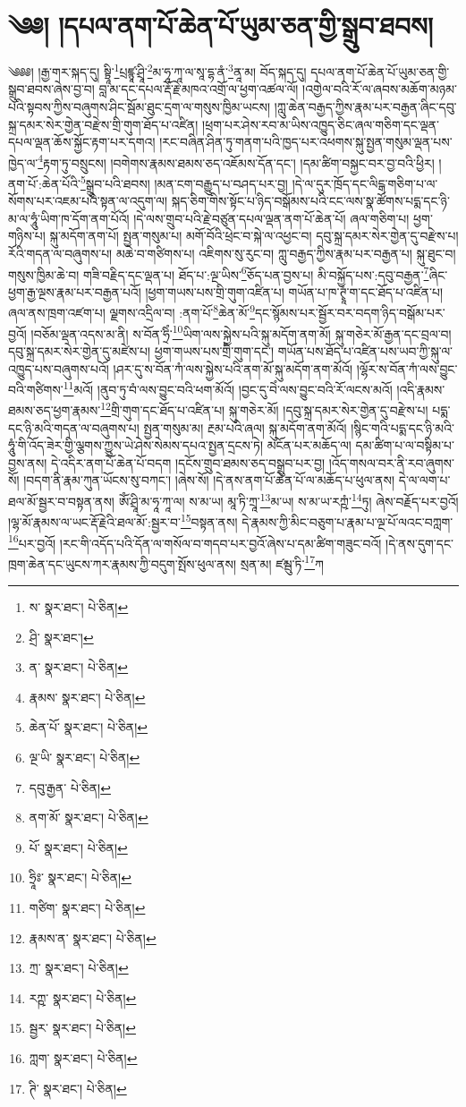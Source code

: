 \setcounter{footnote}{0} 
\chapter{༄༅། །དཔལ་ནག་པོ་ཆེན་པོ་ཡུམ་ཅན་གྱི་སྒྲུབ་ཐབས།}༄༅༅། །རྒྱ་གར་སྐད་དུ། སྟྲཱི་\footnote{ས་  སྣར་ཐང་།  པེ་ཅིན། }པྲཛྙཱ་ཤྲཱི་\footnote{ཤྲི་  སྣར་ཐང་། }མ་ཧཱ་ཀཱ་ལ་སཱ་དྷ་ནཾ་\footnote{ན་  སྣར་ཐང་།  པེ་ཅིན། }ནཱ་མ། བོད་སྐད་དུ། དཔལ་ནག་པོ་ཆེན་པོ་ཡུམ་ཅན་གྱི་སྒྲུབ་ཐབས་ཞེས་བྱ་བ། བླ་མ་དང་དཔལ་རྡོ་རྗེ་མཁའ་འགྲོ་ལ་ཕྱག་འཚལ་ལོ། །འགྱེལ་བའི་རོ་ལ་ཞབས་མཆོག་མཉམ་པའི་སྟབས་ཀྱིས་བཞུགས་ཤིང་སྦོམ་ཐུང་དྲག་ལ་གསུས་ཁྱིམ་ཡངས། །ཀླུ་ཆེན་བརྒྱད་ཀྱིས་རྣམ་པར་བརྒྱན་ཞིང་དབུ་སྐྲ་དམར་སེར་གྱེན་བརྫེས་གྲི་གུག་ཐོད་པ་འཛིན། །ཕྲག་པར་ཤེས་རབ་མ་ཡིས་འཁྱུད་ཅིང་ཞལ་གཅིག་དང་ལྡན་དཔལ་ལྡན་ཆོས་སྐྱོང་རྟག་པར་དགའ། །རང་བཞིན་ཤིན་ཏུ་གནག་པའི་ཁྱད་པར་འཕགས་སྐུ་སྤྱན་གསུམ་ལྡན་པས་ཁྱེད་ལ་\footnote{རྣམས་  སྣར་ཐང་།  པེ་ཅིན། }རྟག་ཏུ་བསྲུངས། །བགེགས་རྣམས་ཐམས་ཅད་འཇོམས་དོན་དང་། །དམ་ཚིག་བསྐྱང་བར་བྱ་བའི་ཕྱིར། །ནག་པོ་:ཆེན་པོའི་\footnote{ཆེན་པོ་  སྣར་ཐང་།  པེ་ཅིན། }སྒྲུབ་པའི་ཐབས། །མན་ངག་བརྒྱུད་པ་བཤད་པར་བྱ། །དེ་ལ་དུར་ཁྲོད་དང་ལིངྒ་གཅིག་པ་ལ་སོགས་པར་འཇམ་པའི་སྟན་ལ་འདུག་ལ། སྐད་ཅིག་གིས་སྟོང་པ་ཉིད་བསྒོམས་པའི་ངང་ལས་སྣ་ཚོགས་པདྨ་དང་ཉི་མ་ལ་ཧཱུཾ་ཡིག་ཁ་དོག་ནག་པོའོ། །དེ་ལས་གྲུབ་པའི་རྗེ་བཙུན་དཔལ་ལྡན་ནག་པོ་ཆེན་པོ། ཞལ་གཅིག་པ། ཕྱག་གཉིས་པ། སྐུ་མདོག་ནག་པོ། སྤྱན་གསུམ་པ། མགོ་བོའི་ཕྲེང་བ་སྐེ་ལ་འཕྱང་བ། དབུ་སྐྲ་དམར་སེར་གྱེན་དུ་བརྫེས་པ། རོའི་གདན་ལ་བཞུགས་པ། མཆེ་བ་གཙིགས་པ། འཇིགས་སུ་རུང་བ། ཀླུ་བརྒྱད་ཀྱིས་རྣམ་པར་བརྒྱན་པ། སྐུ་ཐུང་བ། གསུས་ཁྱིམ་ཆེ་བ། གཟི་བརྗིད་དང་ལྡན་པ། ཐོད་པ་:ལྔ་ཡིས་\footnote{ལྔ་ཡི་  སྣར་ཐང་།  པེ་ཅིན། }ཅོད་པན་བྱས་པ། མི་བསྐྱོད་པས་:དབུ་བརྒྱན་\footnote{དབུ་རྒྱན་  པེ་ཅིན། }ཞིང་ཕྱག་རྒྱ་ལྔས་རྣམ་པར་བརྒྱན་པའོ། །ཕྱག་གཡས་པས་གྲི་གུག་འཛིན་པ། གཡོན་པ་ཁ་ཊྭཱཾ་ག་དང་ཐོད་པ་འཛིན་པ། ཞལ་ནས་ཁྲག་འཛག་པ། ལྗགས་འདྲིལ་བ། :ནག་པོ་\footnote{ནག་མོ་  སྣར་ཐང་།  པེ་ཅིན། }ཆེན་མོ་\footnote{པོ་  སྣར་ཐང་།  པེ་ཅིན། }དང་སྙོམས་པར་སྦྱོར་བར་བདག་ཉིད་བསྒོམ་པར་བྱའོ། །བཅོམ་ལྡན་འདས་མ་ནི། ས་བོན་ཧྲིཾ་\footnote{ཧྲཱིཿ་  སྣར་ཐང་།  པེ་ཅིན། }ཡིག་ལས་སྐྱེས་པའི་སྐུ་མདོག་ནག་མོ། སྐུ་གཅེར་མོ་རྒྱན་དང་བྲལ་བ། དབུ་སྐྲ་དམར་སེར་གྱེན་དུ་མཛེས་པ། ཕྱག་གཡས་པས་གྲི་གུག་དང་། གཡོན་པས་ཐོད་པ་འཛིན་པས་ཡབ་ཀྱི་སྐུ་ལ་འཁྱུད་པས་བཞུགས་པའོ། །ཤར་དུ་ས་བོན་ཀཾ་ལས་སྐྱེས་པའི་ནག་མོ་སྐུ་མདོག་ནག་མོའོ། །ལྷོར་ས་བོན་ཀཾ་ལས་བྱུང་བའི་གཙིགས་\footnote{གཙིག་  སྣར་ཐང་།  པེ་ཅིན། }མའོ། །ནུབ་ཏུ་བཾ་ལས་བྱུང་བའི་ཕག་མོའོ། །བྱང་དུ་བེཾ་ལས་བྱུང་བའི་རོ་ལངས་མའོ། །འདི་རྣམས་ཐམས་ཅད་ཕྱག་རྣམས་\footnote{རྣམས་ན་  སྣར་ཐང་།  པེ་ཅིན། }གྲི་གུག་དང་ཐོད་པ་འཛིན་པ། སྐུ་གཅེར་མོ། །དབུ་སྐྲ་དམར་སེར་གྱེན་དུ་བརྫེས་པ། པདྨ་དང་ཉི་མའི་གདན་ལ་བཞུགས་པ། སྤྱན་གསུམ་མ། རྔམ་པའི་ཞལ། སྐུ་མདོག་ནག་མོའོ། །སྙིང་གའི་པདྨ་དང་ཉི་མའི་ཧཱུཾ་གི་འོད་ཟེར་གྱི་ལྕགས་ཀྱུས་ཡེ་ཤེས་སེམས་དཔའ་སྤྱན་དྲངས་ཏེ། མངོན་པར་མཆོད་ལ། དམ་ཚིག་པ་ལ་བསྟིམ་པ་བྱས་ནས། དེ་འདིར་ནག་པོ་ཆེན་པོ་བདག །དངོས་གྲུབ་ཐམས་ཅད་བསྒྲུབ་པར་བྱ། །འོད་གསལ་བར་ནི་རབ་ཞུགས་སོ། །བདག་ནི་རྣམ་ཀུན་ཡོངས་སུ་བཀང་། །ཞེས་སོ། །དེ་ནས་ནག་པོ་ཆེན་པོ་ལ་མཆོད་པ་ཕུལ་ནས། དེ་ལ་ལག་པ་ཐལ་མོ་སྦྱར་བ་བསྟན་ནས། ཨོཾ་ཤྲཱི་མ་ཧཱ་ཀཱ་ལ། ས་མ་ཡ། མཱ་ཏི་ཀྲཱ་\footnote{ཀྲ་  སྣར་ཐང་།  པེ་ཅིན། }མ་ཡ། ས་མ་ཡ་རཀྵཾ་\footnote{རཀྵ་  སྣར་ཐང་།  པེ་ཅིན། }ཏུ། ཞེས་བརྗོད་པར་བྱའོ། །ལྷ་མོ་རྣམས་ལ་ཡང་རྡོ་རྗེའི་ཐལ་མོ་:སྦྱར་བ་\footnote{སྦྱར་  སྣར་ཐང་།  པེ་ཅིན། }བསྟན་ནས། དེ་རྣམས་ཀྱི་མིང་བཅུག་པ་རྣམ་པ་ལྔ་པོ་ལའང་བཀླག་\footnote{ཀླག་  སྣར་ཐང་།  པེ་ཅིན། }པར་བྱའོ། །རང་གི་འདོད་པའི་དོན་ལ་གསོལ་བ་གདབ་པར་བྱའོ་ཞེས་པ་དམ་ཚིག་གཟུང་བའོ། །དེ་ནས་དུག་དང་ཁྲག་ཆེན་དང་ཡུངས་ཀར་རྣམས་ཀྱི་བདུག་སྤོས་ཕུལ་ནས། སྲན་མ། ཛམྦུ་ཏི་\footnote{ཊི་  སྣར་ཐང་།  པེ་ཅིན། }ཀ 